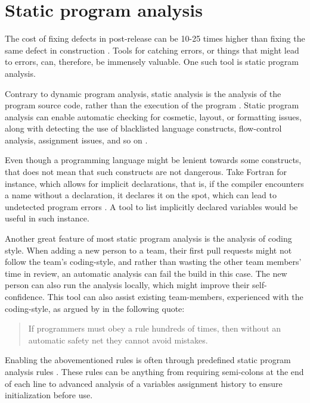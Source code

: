 \section{Static program analysis} \label{sec:linter}

The cost of fixing defects in post-release can be 10-25 times higher than fixing the same defect in construction \cite[p.~29]{mcconnell_code_2004}. Tools for catching errors, or things that might lead to errors, can, therefore, be immensely valuable. One such tool is static program analysis.

Contrary to dynamic program analysis, static analysis is the analysis of the program source code, rather than the execution of the program \cite{wichmann_industrial_1995}. Static program analysis can enable automatic checking for cosmetic, layout, or formatting issues, along with detecting the use of blacklisted language constructs, flow-control analysis, assignment issues, and so on \cite{wichmann_industrial_1995}. 

Even though a programming language might be lenient towards some constructs, that does not mean that such constructs are not dangerous. Take Fortran for instance, which allows for implicit declarations, that is, if the compiler encounters a name without a declaration, it declares it on the spot, which can lead to undetected program errors \cite{wichmann_industrial_1995}. A tool to list implicitly declared variables would be useful in such instance.

Another great feature of most static program analysis is the analysis of coding style. When adding a new person to a team, their first pull requests might not follow the team's coding-style, and rather than wasting the other team members' time in review, an automatic analysis can fail the build in this case. The new person can also run the analysis locally, which might improve their self-confidence. This tool can also assist existing team-members, experienced with the coding-style, as argued by \cite{bessey_few_2010} in the following quote:

\begin{quote}
    If programmers must obey a rule hundreds of times, then without an automatic safety net they cannot avoid mistakes. \cite{bessey_few_2010}
\end{quote}

Enabling the abovementioned rules is often through predefined static program analysis rules \cite{bessey_few_2010}. These rules can be anything from requiring semi-colons at the end of each line to advanced analysis of a variables assignment history to ensure initialization before use.

